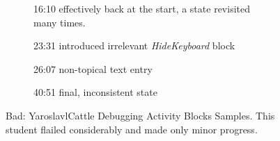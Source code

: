 \begin{figure}
\begin{subfigure}{.45\textwidth}
		\caption{16:10 effectively back at the start, a state revisited many times.} 
	\end{subfigure}\hfill
	\begin{subfigure}{.45\textwidth}
		\caption{23:31 introduced irrelevant \emph{HideKeyboard} block} 
	\end{subfigure}\hfill
	\begin{subfigure}{.45\textwidth}
		\caption{26:07 non-topical text entry} 
	\end{subfigure}
	\begin{subfigure}{.45\textwidth}
		\caption{40:51 final, inconsistent state} 
	\end{subfigure}

	\caption[Bad: YaroslavlCattle Debugging Activity Blocks Samples]{Bad: YaroslavlCattle Debugging Activity Blocks Samples. This student flailed considerably and made only minor progress.}
	\label{fig:YaroslavlCattle_blocks}
\end{figure}
